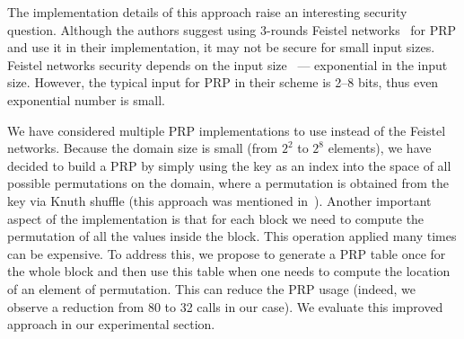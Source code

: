 		The implementation details of this approach raise an interesting security question.
		Although the authors suggest using 3-rounds Feistel networks~\cite{unbalanced-feistel} for PRP and use it in their implementation, it may not be secure for small input sizes.
		Feistel networks security depends on the input size~\cite{feistel-security} --- exponential in the input size.
		However, the typical input for PRP in their scheme is 2--8 bits, thus even exponential number is small.

		We have considered multiple PRP implementations to use instead of the Feistel networks.
		Because the domain size is small (from $2^2$ to $2^8$ elements), we have decided to build a PRP by simply using the key as an index into the space of all possible permutations on the domain, where a permutation is obtained from the key via Knuth shuffle (this approach was mentioned in~\cite{knuth-shuffle-security}).
		Another important aspect of the implementation is that for each block we need to compute the permutation of all the values inside the block.
		This operation applied many times can be expensive.
		To address this, we propose to generate a PRP table once for the whole block and then use this table when one needs to compute the location of an element of permutation.
		This can reduce the PRP usage (indeed, we observe a reduction from 80 to 32 calls in our case).
		We evaluate this improved approach in our experimental section.
